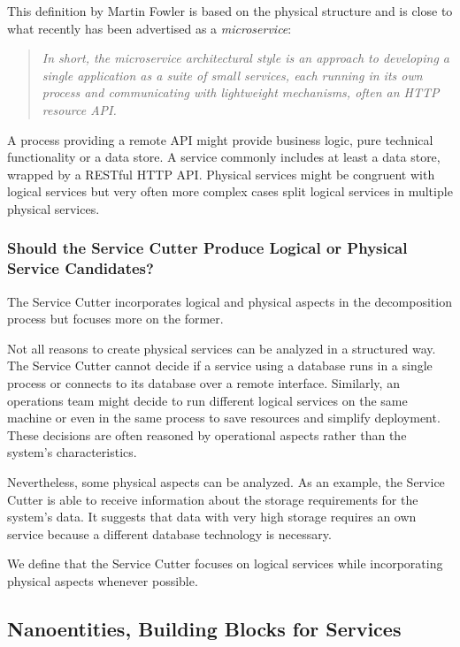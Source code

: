 This definition by Martin Fowler is based on the physical structure and is close to what recently has been advertised as a \textit{microservice}:

\begin{quotation}
	\textit{In short, the microservice architectural style is an approach to developing a single application as a suite of small services, each running in its own process and communicating with lightweight mechanisms, often an HTTP resource API.}\cite{fowlerMicroservice}
\end{quotation}

A process providing a remote API might provide business logic, pure technical functionality or a data store. A service commonly includes at least a data store, wrapped by a RESTful HTTP API. Physical services might be congruent with logical services but very often more complex cases split logical services in multiple physical services. 

\subsubsection{Should the Service Cutter Produce Logical or Physical Service Candidates?}

The Service Cutter incorporates logical and physical aspects in the decomposition process but focuses more on the former. 

Not all reasons to create physical services can be analyzed in a structured way. The Service Cutter cannot decide if a service using a database runs in a single process or connects to its database over a remote interface. Similarly, an operations team might decide to run different logical services on the same machine or even in the same process to save resources and simplify deployment. These decisions are often reasoned by operational aspects rather than the system's characteristics. 

Nevertheless, some physical aspects can be analyzed. As an example, the Service Cutter is able to receive information about the storage requirements for the system's data. It suggests that data with very high storage requires an own service because a different database technology is necessary. 

We define that the Service Cutter focuses on logical services while incorporating physical aspects whenever possible. 

\subsection{Nanoentities, Building Blocks for Services}

